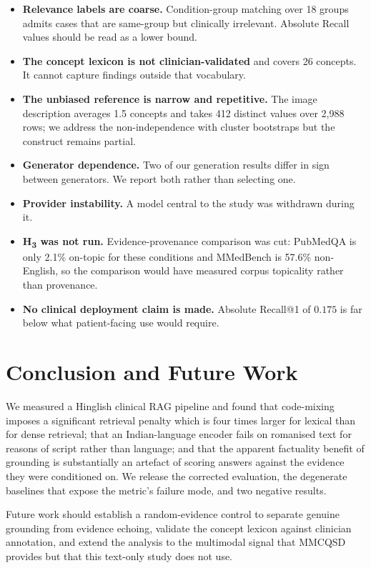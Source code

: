 \documentclass[pdflatex,sn-mathphys-num]{sn-jnl}
\theoremstyle{thmstyleone}
\theoremstyle{thmstyletwo}
\theoremstyle{thmstylethree}
\begin{document}
\begin{itemize}
\item \textbf{Relevance labels are coarse.} Condition-group matching over 18 groups
admits cases that are same-group but clinically irrelevant. Absolute Recall values
should be read as a lower bound.
\item \textbf{The concept lexicon is not clinician-validated} and covers 26 concepts.
It cannot capture findings outside that vocabulary.
\item \textbf{The unbiased reference is narrow and repetitive.} The image description
averages 1.5 concepts and takes 412 distinct values over 2,988 rows; we address the
non-independence with cluster bootstraps but the construct remains partial.
\item \textbf{Generator dependence.} Two of our generation results differ in sign
between generators. We report both rather than selecting one.
\item \textbf{Provider instability.} A model central to the study was withdrawn during
it.
\item \textbf{H\textsubscript{3} was not run.} Evidence-provenance comparison was cut:
PubMedQA is only 2.1\% on-topic for these conditions and MMedBench is 57.6\%
non-English, so the comparison would have measured corpus topicality rather than
provenance.
\item \textbf{No clinical deployment claim is made.} Absolute Recall@1 of $0.175$ is far
below what patient-facing use would require.
\end{itemize}

\section{Conclusion and Future Work}\label{sec:conclusion}

We measured a Hinglish clinical RAG pipeline and found that code-mixing imposes a
significant retrieval penalty which is four times larger for lexical than for dense
retrieval; that an Indian-language encoder fails on romanised text for reasons of
script rather than language; and that the apparent factuality benefit of grounding is
substantially an artefact of scoring answers against the evidence they were conditioned
on. We release the corrected evaluation, the degenerate baselines that expose the
metric's failure mode, and two negative results.

Future work should establish a random-evidence control to separate genuine grounding
from evidence echoing, validate the concept lexicon against clinician annotation, and
extend the analysis to the multimodal signal that MMCQSD provides but that this
text-only study does not use.
\end{document}
